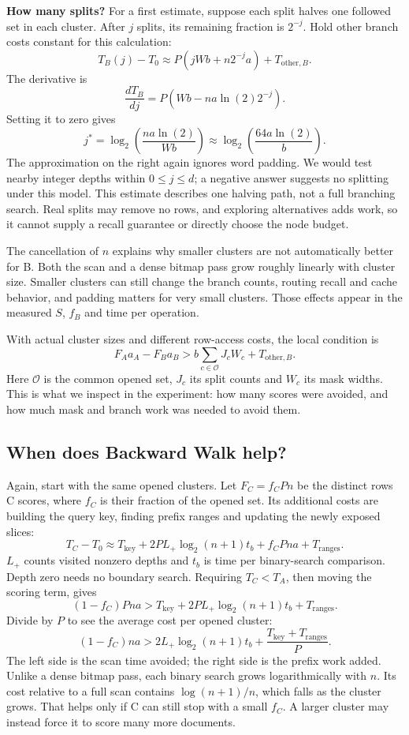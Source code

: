 \textbf{How many splits?}
For a first estimate, suppose each split halves one followed set in each cluster. After $j$ splits, its remaining fraction is $2^{-j}$. Hold other branch costs constant for this calculation:
\[
 T_B(j)-T_0\approx P\left(jWb+n2^{-j}a\right)+T_{\mathrm{other},B}.
\]
The derivative is
\[
 \frac{dT_B}{dj}=P\left(Wb-na\ln(2)2^{-j}\right).
\]
Setting it to zero gives
\[
 \boxed{j^*=\log_2\!\left(\frac{na\ln(2)}{Wb}\right)
       \approx\log_2\!\left(\frac{64a\ln(2)}{b}\right).}
\]
The approximation on the right again ignores word padding. We would test nearby integer depths within $0\le j\le d$; a negative answer suggests no splitting under this model. This estimate describes one halving path, not a full branching search. Real splits may remove no rows, and exploring alternatives adds work, so it cannot supply a recall guarantee or directly choose the node budget.

The cancellation of $n$ explains why smaller clusters are not automatically better for B. Both the scan and a dense bitmap pass grow roughly linearly with cluster size. Smaller clusters can still change the branch counts, routing recall and cache behavior, and padding matters for very small clusters. Those effects appear in the measured $S$, $f_B$ and time per operation.

With actual cluster sizes and different row-access costs, the local condition is
\[
 \boxed{F_Aa_A-F_Ba_B>
       b\sum_{c\in\mathcal O}J_cW_c+T_{\mathrm{other},B}.}
\]
Here $\mathcal O$ is the common opened set, $J_c$ its split counts and $W_c$ its mask widths. This is what we inspect in the experiment: how many scores were avoided, and how much mask and branch work was needed to avoid them.

\subsection{When does Backward Walk help?}
\label{sec:prefix-optima}
Again, start with the same opened clusters. Let $F_C=f_CPn$ be the distinct rows C scores, where $f_C$ is their fraction of the opened set. Its additional costs are building the query key, finding prefix ranges and updating the newly exposed slices:
\[
 T_C-T_0\approx T_{\mathrm{key}}+
 2PL_+\log_2(n+1)t_b+f_CPna+T_{\mathrm{ranges}}.
\]
$L_+$ counts visited nonzero depths and $t_b$ is time per binary-search comparison. Depth zero needs no boundary search. Requiring $T_C<T_A$, then moving the scoring term, gives
\[
 (1-f_C)Pna>T_{\mathrm{key}}+
 2PL_+\log_2(n+1)t_b+T_{\mathrm{ranges}}.
\]
Divide by $P$ to see the average cost per opened cluster:
\[
 \boxed{(1-f_C)na>2L_+\log_2(n+1)t_b+
       \frac{T_{\mathrm{key}}+T_{\mathrm{ranges}}}{P}.}
\]
The left side is the scan time avoided; the right side is the prefix work added. Unlike a dense bitmap pass, each binary search grows logarithmically with $n$. Its cost relative to a full scan contains $\log(n+1)/n$, which falls as the cluster grows. That helps only if C can still stop with a small $f_C$. A larger cluster may instead force it to score many more documents.

